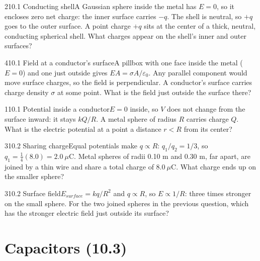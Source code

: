 \documentclass[11pt]{article}
\begin{document}
\begin{q}{2}{10.1 Conducting shell}{A Gaussian sphere inside the metal has $E = 0$, so it encloses zero net charge: the inner surface carries $-q$. The shell is neutral, so $+q$ goes to the outer surface.}
A point charge $+q$ sits at the center of a thick, neutral, conducting spherical shell. What charges appear on the shell's inner and outer surfaces?
\end{q}
\begin{q}{4}{10.1 Field at a conductor's surface}{A pillbox with one face inside the metal ($E = 0$) and one just outside gives $EA = \sigma A/\varepsilon_0$. Any parallel component would move surface charges, so the field is perpendicular.}
A conductor's surface carries charge density $\sigma$ at some point. What is the field just outside the surface there?
\end{q}
\begin{q}{1}{10.1 Potential inside a conductor}{$E = 0$ inside, so $V$ does not change from the surface inward: it stays $kQ/R$.}
A metal sphere of radius $R$ carries charge $Q$. What is the electric potential at a point a distance $r < R$ from its center?
\end{q}
\begin{q}{3}{10.2 Sharing charge}{Equal potentials make $q \propto R$: $q_1/q_2 = 1/3$, so $q_1 = \tfrac14(8.0) = 2.0\ \mu\mathrm{C}$.}
Metal spheres of radii 0.10 m and 0.30 m, far apart, are joined by a thin wire and share a total charge of $8.0\ \mu\mathrm{C}$. What charge ends up on the smaller sphere?
\end{q}
\begin{q}{3}{10.2 Surface field}{$E_{surface} = kq/R^2$ and $q \propto R$, so $E \propto 1/R$: three times stronger on the small sphere.}
For the two joined spheres in the previous question, which has the stronger electric field just outside its surface?
\end{q}

\section{Capacitors (10.3)}
\end{document}
